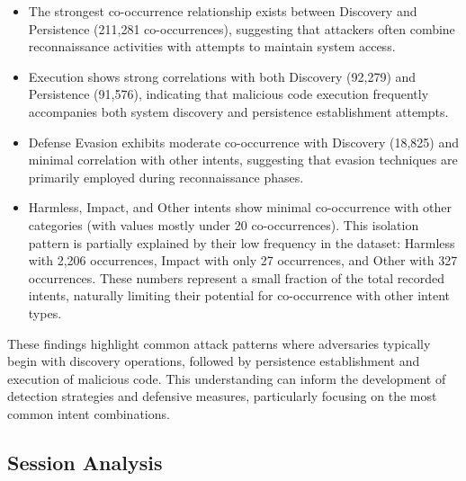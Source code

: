         \begin{itemize}
        
            \item The strongest co-occurrence relationship exists between Discovery and Persistence (211,281 co-occurrences), suggesting that attackers often combine reconnaissance activities with attempts to maintain system access.

            \vspace{0.2em}

            \item Execution shows strong correlations with both Discovery (92,279) and Persistence (91,576), indicating that malicious code execution frequently accompanies both system discovery and persistence establishment attempts.

            \vspace{0.2em}

            \item Defense Evasion exhibits moderate co-occurrence with Discovery (18,825) and minimal correlation with other intents, suggesting that evasion techniques are primarily employed during reconnaissance phases.

            \vspace{0.2em}

            \item Harmless, Impact, and Other intents show minimal co-occurrence with other categories (with values mostly under 20 co-occurrences). This isolation pattern is partially explained by their low frequency in the dataset: Harmless with 2,206 occurrences, Impact with only 27 occurrences, and Other with 327 occurrences. These numbers represent a small fraction of the total recorded intents, naturally limiting their potential for co-occurrence with other intent types.
            
        \end{itemize}

        These findings highlight common attack patterns where adversaries typically begin with discovery operations, followed by persistence establishment and execution of malicious code. This understanding can inform the development of detection strategies and defensive measures, particularly focusing on the most common intent combinations.
        
    \subsection{Session Analysis}

